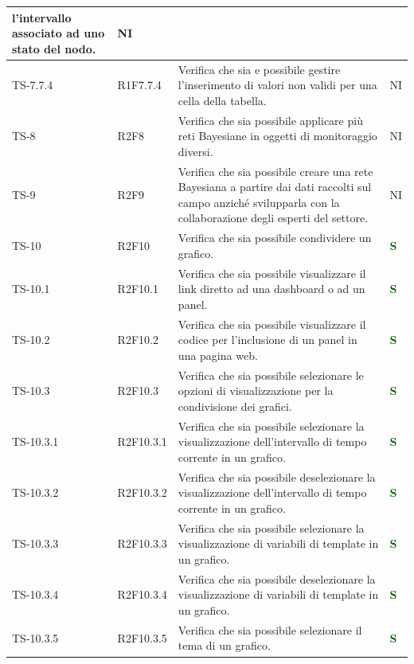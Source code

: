 \begin{longtable}{|C{2.5cm}|C{2.5cm}|C{6.5cm}|C{1.5cm}|}
			l'intervallo associato ad uno stato del
			nodo.
  & {NI}\\
			\hline
			{TS-7.7.4} & {R1F7.7.4} & Verifica che sia e possibile gestire
			l'inserimento di valori non validi per
			una cella della tabella.  & {NI}\\
			\hline
			{TS-8} & {R2F8} & Verifica che sia possibile applicare più reti
			Bayesiane in oggetti di monitoraggio
			diversi.  & {NI}\\
			\hline
			{TS-9} & {R2F9} & Verifica che sia  possibile creare una rete
			Bayesiana a partire dai dati raccolti
			sul campo anziché svilupparla con la
			collaborazione degli esperti del settore.  & {NI}\\
			\hline
			{TS-10} & {R2F10} & Verifica che sia possibile condividere un
			grafico.  & \textcolor{darkgreen}{\textbf{S}}\\
			\hline
			{TS-10.1} & {R2F10.1} & Verifica che sia possibile visualizzare il
			link diretto ad una dashboard o ad un
			panel.  & \textcolor{darkgreen}{\textbf{S}}\\
			\hline
			{TS-10.2} & {R2F10.2} & Verifica che sia  possibile visualizzare il
			codice per l’inclusione di un panel in
			una pagina web.  & \textcolor{darkgreen}{\textbf{S}}\\
			\hline
			{TS-10.3} & {R2F10.3} & Verifica che sia possibile selezionare le
			opzioni di visualizzazione per la
			condivisione dei grafici.
  & \textcolor{darkgreen}{\textbf{S}}\\
			\hline
			{TS-10.3.1} & {R2F10.3.1} & Verifica che sia  possibile selezionare la
			visualizzazione dell'intervallo di tempo
			corrente in un grafico.  & \textcolor{darkgreen}{\textbf{S}}\\
			\hline
			{TS-10.3.2} & {R2F10.3.2} & Verifica che sia  possibile deselezionare la
			visualizzazione dell'intervallo di tempo
			corrente in un grafico.
  & \textcolor{darkgreen}{\textbf{S}}\\
			\hline
			{TS-10.3.3} & {R2F10.3.3} & Verifica che sia possibile selezionare la
			visualizzazione di variabili di template
			in un grafico.  & \textcolor{darkgreen}{\textbf{S}}\\
			\hline
			{TS-10.3.4} & {R2F10.3.4} & Verifica che sia  possibile deselezionare la
			visualizzazione di variabili di template
			in un grafico.  & \textcolor{darkgreen}{\textbf{S}}\\
			\hline
			{TS-10.3.5} & {R2F10.3.5} & Verifica che sia possibile selezionare il
			tema di un grafico.  & \textcolor{darkgreen}{\textbf{S}}\\

\end{longtable}
